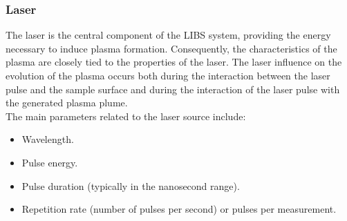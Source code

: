 \subsubsection{Laser}
\label{subsubsec:laser_setup_component}
The laser is the central component of the LIBS system, providing the energy necessary to induce plasma formation. Consequently, the characteristics of the plasma are closely tied to the properties of the laser. The laser influence on the evolution of the plasma occurs both during the interaction between the laser pulse and the sample surface and during the interaction of the laser pulse with the generated plasma plume.
\\
The main parameters related to the laser source include:
\begin{itemize}
    \item Wavelength.
    \item Pulse energy.
    \item Pulse duration (typically in the nanosecond range).
    \item Repetition rate (number of pulses per second) or pulses per measurement.    
\end{itemize}

